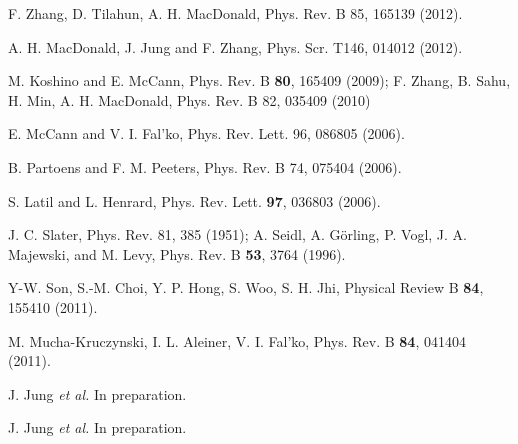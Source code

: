 \documentclass[twocolumn,prb,showpacs,preprintnumbers,amsmath,amssymb]{revtex4}
\begin{document}
\begin{thebibliography}{99}
F. Zhang, D. Tilahun, A. H. MacDonald,
Phys. Rev. B 85, 165139 (2012).

   A. H. MacDonald, J. Jung and F. Zhang,
                Phys. Scr. T146, 014012 (2012).


M. Koshino and E. McCann, Phys. Rev. B {\bf 80}, 165409 (2009);
F. Zhang, B. Sahu, H. Min, A. H. MacDonald, Phys. Rev. B 82, 035409 (2010)


E. McCann and V. I. Fal'ko, Phys. Rev. Lett. 96, 086805 (2006).
             
             
             B. Partoens and F. M. Peeters, Phys. Rev. B 74, 075404 (2006).
             
             
             S. Latil and L. Henrard, Phys. Rev. Lett. {\bf 97}, 036803 (2006).
             
             
J. C. Slater, Phys. Rev. 81, 385 (1951); 
A. Seidl, A. G\"orling, P. Vogl,
J. A. Majewski, and M. Levy, Phys. Rev. B {\bf 53}, 3764 (1996).


             
	     Y-W. Son, S.-M. Choi, Y. P. Hong, S. Woo, S. H. Jhi,
	     Physical Review B {\bf 84}, 155410 (2011).
	     
             M. Mucha-Kruczynski, I. L. Aleiner, V. I. Fal'ko,
             Phys. Rev. B {\bf 84}, 041404 (2011). 
           

             J. Jung {\em et al.} In preparation.
             
             J. Jung {\em et al.} In preparation.
             
             
\end{thebibliography}
\end{document}
